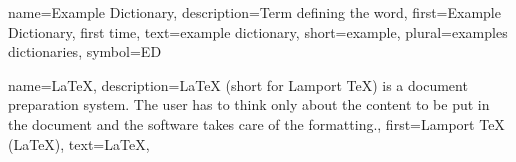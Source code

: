 {
    name={Example Dictionary},
    description={Term defining the word},
    first={Example Dictionary, first time},
    text={example dictionary},
    short={example},
    plural={examples dictionaries},
    symbol={ED}
}

{
    name={\LaTeX},
    description={LaTeX (short for Lamport TeX) is a document preparation system. The user has to
            think only about the content to be put in the document and the software takes care of
            the formatting.},
    first={Lamport TeX (\LaTeX)},
    text={\LaTeX},
}
